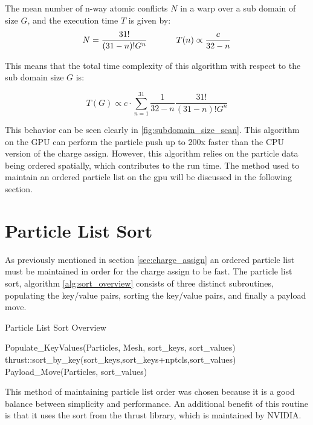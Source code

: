 The mean number of n-way atomic conflicts $N$ in a warp over a sub domain of size $G$, and the execution time $T$ is given by:
\begin{equation}
N = \frac{31!}{(31-n)! G^n} \hspace{0.1\textwidth} T(n) \propto \frac{c}{32-n}
\end{equation}

This means that the total time complexity of this algorithm with respect to the sub domain size $G$ is:

\begin{equation}
T(G) \propto c \cdot \sum_{n=1}^{31} \frac{1}{32-n} \frac{31!}{(31-n)! G^n}
\end{equation}

This behavior can be seen clearly in \ref{fig:subdomain_size_scan}. This algorithm on the GPU can perform the particle push up to 200x faster than the CPU version of the charge assign. However, this algorithm relies on the particle data being ordered spatially, which contributes to the run time. The method used to maintain an ordered particle list on the gpu will be discussed in the following section.


	\section{Particle List Sort}
	\label{sec:plist_sort}
	
	As previously mentioned in section \ref{sec:charge_assign} an ordered particle list must be maintained in order for the charge assign to be fast. The particle list sort, algorithm \ref{alg:sort_overview} consists of three distinct subroutines, populating the key/value pairs, sorting the key/value pairs, and finally a payload move. 

\begin{algorithm}
	\caption{Particle List Sort Overview}
	\label{alg:sort_overview}
	\begin{algorithmic}
		\STATE
		\STATE Populate\_KeyValues(Particles, Mesh, sort\_keys, sort\_values)
		\STATE
		\STATE thrust::sort\_by\_key(sort\_keys,sort\_keys+nptcls,sort\_values)
		\STATE
		\STATE Payload\_Move(Particles, sort\_values)
	\end{algorithmic}
\end{algorithm}

This method of maintaining particle list order was chosen because it is a good balance between simplicity and performance. An additional benefit of this routine is that it uses the sort from the thrust library, which is maintained by NVIDIA. 

